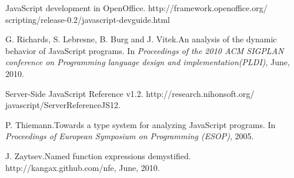 \documentclass[10pt, preprint]{sigplanconf}
\begin{document}
\begin{thebibliography}{}
JavaScript development in OpenOffice.
\newblock http://framework.openoffice.org/ scripting/release-0.2/javascript-devguide.html

G. Richards, S. Lebresne, B. Burg and J. Vitek.\newblock An analysis of the dynamic behavior of JavaScript programs.
\newblock In \emph{Proceedings of the 2010 ACM SIGPLAN conference on Programming language design and implementation(PLDI)},
June, 2010.

Server-Side JavaScript Reference v1.2.
\newblock http://research.nihonsoft.org/ javascript/ServerReferenceJS12.

P. Thiemann.\newblock Towards a type system for analyzing JavaScript programs.
\newblock In \emph{Proceedings of European Symposium on Programming (ESOP)},
2005.

J. Zaytsev.\newblock Named function expressions demystified.
\newblock http://kangax.github.com/nfe,
June, 2010.


\end{thebibliography}
\end{document}
